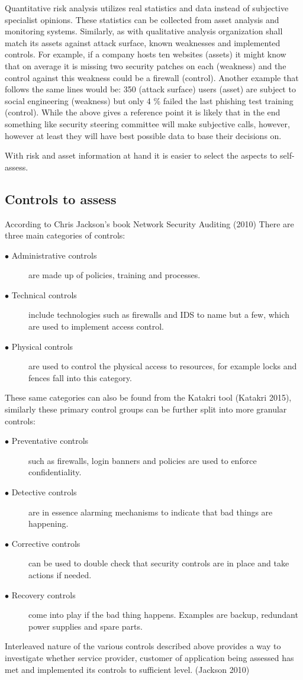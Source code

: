 \documentclass{article}
\begin{document}
\par
Quantitative risk analysis utilizes real statistics and data instead of subjective specialist opinions. These statistics can be collected from asset analysis and monitoring systems.
Similarly, as with qualitative analysis organization shall match its assets against attack surface, known weaknesses and implemented controls. For example, if a company hosts ten websites (assets) it might know that on average it is missing two security patches on each (weakness) and the control against this weakness could be a firewall (control). Another example that follows the same lines would be: 350 (attack surface) users (asset) are subject to social engineering (weakness) but only 4 \% failed the last phishing test training (control).
While the above gives a reference point it is likely that in the end something like security steering committee will make subjective calls, however, however at least they will have best possible data to base their decisions on.
\par
With risk and asset information at hand it is easier to select the aspects to self-assess. 
\subsection{Controls to assess}
According to Chris Jackson's book Network Security Auditing (2010) There are three main categories of controls:
\begin{description}
	\item[$\bullet$ Administrative controls] are made up of policies, training and processes.
	\item[$\bullet$ Technical controls] include technologies such as firewalls and IDS to name but a few, which are used to implement access control.
	\item[$\bullet$ Physical controls] are used to control the physical access to resources, for example locks and fences fall into this category.
\end{description}
These same categories can also be found from the Katakri tool (Katakri 2015), similarly these primary control groups can be further split into more granular controls:
\begin{description}
	\item[$\bullet$ Preventative controls] such as firewalls, login banners and policies are used to enforce confidentiality.
	\item[$\bullet$ Detective controls] are in essence alarming mechanisms to indicate that bad things are happening.
	\item[$\bullet$ Corrective controls] can be used to double check that security controls are in place and take actions if needed.
	\item[$\bullet$ Recovery controls] come into play if the bad thing happens. Examples are backup, redundant power supplies and spare parts.
\end{description}
Interleaved nature of the various controls described above provides a way to investigate whether service provider, customer of application being assessed has met and implemented its controls to sufficient level. (Jackson 2010)
\break
\end{document}
